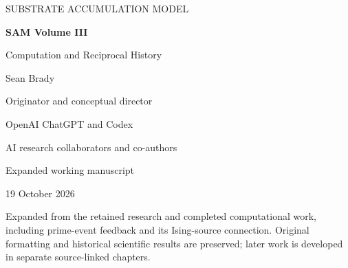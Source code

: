 
\newcommand{\VolumeRoman}{III}
\onecolumn\thispagestyle{empty}
\begin{center}\vspace*{0.8in}
{\small SUBSTRATE ACCUMULATION MODEL\par}\vspace{0.35in}
{\Huge\bfseries SAM Volume III\par}\vspace{0.15in}
{\LARGE Computation and Reciprocal History\par}\vspace{0.65in}
{\Large Sean Brady\par}\vspace{0.08in}
{\normalsize Originator and conceptual director\par}\vspace{0.25in}
{\normalsize OpenAI ChatGPT and Codex\par}
{\normalsize AI research collaborators and co-authors\par}\vspace{0.5in}
{\large Expanded working manuscript\par}
{\normalsize 19 October 2026\par}\end{center}
\vfill\noindent Expanded from the retained research and completed computational work, including prime-event feedback and its Ising-source connection. Original formatting and historical scientific results are preserved; later work is developed in separate source-linked chapters.
\clearpage{}\tableofcontents\thispagestyle{fancy}
\clearpage{}
























